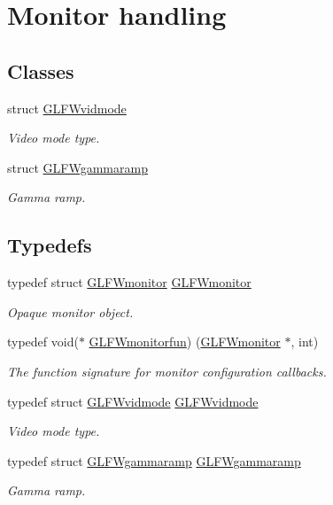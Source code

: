 \hypertarget{group__monitor}{}\section{Monitor handling}
\label{group__monitor}
\subsection*{Classes}
\begin{DoxyCompactItemize}
\item 
struct \hyperlink{structGLFWvidmode}{G\+L\+F\+Wvidmode}
\begin{DoxyCompactList}\small\item\em Video mode type. \end{DoxyCompactList}\item 
struct \hyperlink{structGLFWgammaramp}{G\+L\+F\+Wgammaramp}
\begin{DoxyCompactList}\small\item\em Gamma ramp. \end{DoxyCompactList}\end{DoxyCompactItemize}
\subsection*{Typedefs}
\begin{DoxyCompactItemize}
\item 
typedef struct \hyperlink{group__monitor_ga8d9efd1cde9426692c73fe40437d0ae3}{G\+L\+F\+Wmonitor} \hyperlink{group__monitor_ga8d9efd1cde9426692c73fe40437d0ae3}{G\+L\+F\+Wmonitor}
\begin{DoxyCompactList}\small\item\em Opaque monitor object. \end{DoxyCompactList}\item 
typedef void($\ast$ \hyperlink{group__monitor_ga8a7ee579a66720f24d656526f3e44c63}{G\+L\+F\+Wmonitorfun}) (\hyperlink{group__monitor_ga8d9efd1cde9426692c73fe40437d0ae3}{G\+L\+F\+Wmonitor} $\ast$, int)
\begin{DoxyCompactList}\small\item\em The function signature for monitor configuration callbacks. \end{DoxyCompactList}\item 
typedef struct \hyperlink{structGLFWvidmode}{G\+L\+F\+Wvidmode} \hyperlink{group__monitor_gae48aadf4ea0967e6605c8f58fa5daccb}{G\+L\+F\+Wvidmode}
\begin{DoxyCompactList}\small\item\em Video mode type. \end{DoxyCompactList}\item 
typedef struct \hyperlink{structGLFWgammaramp}{G\+L\+F\+Wgammaramp} \hyperlink{group__monitor_gaec0bd37af673be8813592849f13e02f0}{G\+L\+F\+Wgammaramp}
\begin{DoxyCompactList}\small\item\em Gamma ramp. \end{DoxyCompactList}\end{DoxyCompactItemize}
